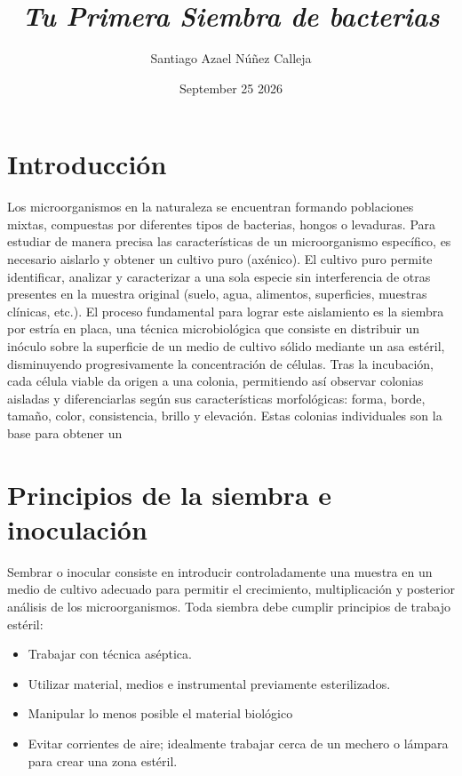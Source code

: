 \documentclass{article}
\title{\textbf{\textit{Tu Primera Siembra de bacterias}}}
\author{Santiago Azael Núñez Calleja}
\date{September 25 2026}
\begin{document}
\maketitle

\section{Introducción}
\noindent Los microorganismos en la naturaleza se encuentran formando poblaciones mixtas, compuestas por diferentes tipos de bacterias, hongos o levaduras. Para estudiar de manera precisa las características de un microorganismo específico, es necesario aislarlo y obtener un cultivo puro (axénico). El cultivo puro permite identificar, analizar y caracterizar a una sola especie sin interferencia de otras presentes en la muestra original (suelo, agua, alimentos, superficies, muestras clínicas, etc.).
El proceso fundamental para lograr este aislamiento es la siembra por estría en placa, una técnica microbiológica que consiste en distribuir un inóculo sobre la superficie de un medio de cultivo sólido mediante un asa estéril, disminuyendo progresivamente la concentración de células. Tras la incubación, cada célula viable da origen a una colonia, permitiendo así observar colonias aisladas y diferenciarlas según sus características morfológicas: forma, borde, tamaño, color, consistencia, brillo y elevación. Estas colonias individuales son la base para obtener un 
\section{Principios de la siembra e inoculación}
\noindent Sembrar o inocular consiste en introducir controladamente una muestra en un medio de cultivo adecuado para permitir el crecimiento, multiplicación y posterior análisis de los microorganismos. Toda siembra debe cumplir principios de trabajo estéril:
\begin{itemize}
    \item Trabajar con técnica aséptica.
    \item Utilizar material, medios e instrumental previamente esterilizados.
    \item Manipular lo menos posible el material biológico
    \item Evitar corrientes de aire; idealmente trabajar cerca de un mechero o lámpara para crear una zona estéril.
\end{itemize}
\end{document}
